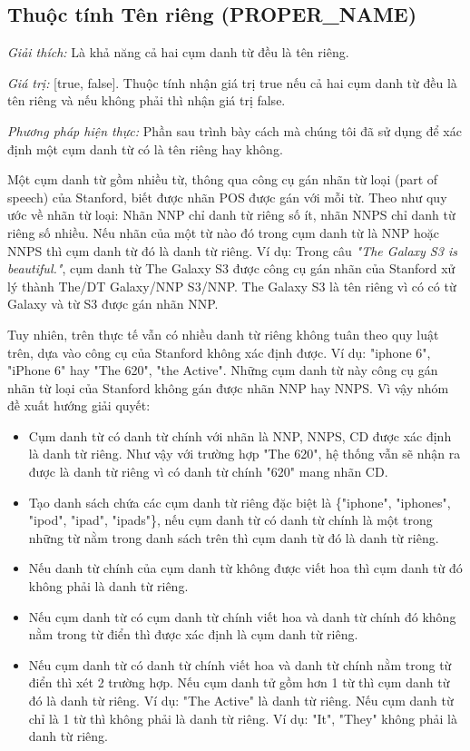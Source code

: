 \documentclass[12pt]{report}
\begin{document}
			\subsection*{Thuộc tính Tên riêng (PROPER\_NAME)}
				\par \textit{Giải thích:} Là khả năng cả hai cụm danh từ đều là tên riêng.
				\par \textit{Giá trị:} [true, false]. Thuộc tính nhận giá trị true nếu cả hai cụm danh từ đều là tên riêng và nếu không phải thì nhận giá trị false.
				\par \textit{Phương pháp hiện thực:} Phần sau trình bày cách mà chúng tôi đã sử dụng để xác định một cụm danh từ có là tên riêng hay không.				
				\par Một cụm danh từ gồm nhiều từ, thông qua công cụ gán nhãn từ loại (part of speech) của Stanford, biết được nhãn POS được gán với mỗi từ. Theo như quy ước về nhãn từ loại: Nhãn NNP chỉ danh từ riêng số ít, nhãn NNPS chỉ danh từ riêng số nhiều. Nếu nhãn của một từ nào đó trong cụm danh từ là NNP hoặc NNPS thì cụm danh từ đó là danh từ riêng. Ví dụ: Trong câu \textit{"The Galaxy S3 is beautiful."}, cụm danh từ The Galaxy S3 được công cụ gán nhãn của Stanford xử lý thành The/DT Galaxy/NNP S3/NNP. The Galaxy S3 là tên riêng vì có có từ Galaxy và từ S3 được gán nhãn NNP.
				\par Tuy nhiên, trên thực tế vẫn có nhiều danh từ riêng không tuân theo quy luật trên, dựa vào công cụ của Stanford không xác định được. Ví dụ: "iphone 6", "iPhone 6" hay "The 620", "the Active". Những cụm danh từ này công cụ gán nhãn từ loại của Stanford không gán được nhãn NNP hay NNPS. Vì vậy nhóm đề xuất hướng giải quyết:
				\begin{itemize}
					\item{Cụm danh từ có danh từ chính với nhãn là NNP, NNPS, CD được xác định là danh từ riêng. Như vậy với trường hợp "The 620", hệ thống vẫn sẽ nhận ra được là danh từ riêng vì có danh từ chính "620" mang nhãn CD.}
					\item{Tạo danh sách chứa các cụm danh từ riêng đặc biệt là \{"iphone", "iphones", "ipod", "ipad", "ipads"\}, nếu cụm danh từ có danh từ chính là một trong những từ nằm trong danh sách trên thì cụm danh từ đó là danh từ riêng.}
					\item{Nếu danh từ chính của cụm danh từ không được viết hoa thì cụm danh từ đó không phải là danh từ riêng.}
					\item{Nếu cụm danh từ có cụm danh từ chính viết hoa và danh từ chính đó không nằm trong từ điển thì được xác định là cụm danh từ riêng.}
					\item{Nếu cụm danh từ có danh từ chính viết hoa và danh từ chính nằm trong từ điển thì xét 2 trường hợp. Nếu cụm danh tử gồm hơn 1 từ thì cụm danh từ đó là danh từ riêng. Ví dụ: "The Active" là danh từ riêng. Nếu cụm danh từ chỉ là 1 từ thì không phải là danh từ riêng. Ví dụ: "It", "They" không phải là danh từ riêng.}
				\end{itemize}
\end{document}
